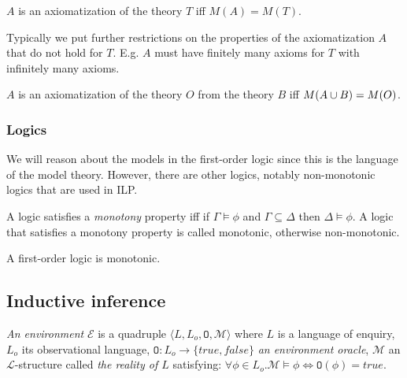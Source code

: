 \begin{defn}
$A$ is an axiomatization of the theory $T$ iff $M(A)=M(T)$.
\end{defn}

\begin{remark}
Typically we put further restrictions on the properties of the axiomatization $A$ that do not hold for $T$. E.g. $A$ must have finitely many axioms for $T$ with infinitely many axioms.
\end{remark}

\begin{defn}
$A$ is an axiomatization of the theory $O$ from the theory $B$ iff $M(A \cup B)=M(O)$.
\end{defn}

\subsubsection{Logics\cite{stanford2010}}
\begin{defn}
We will reason about the models in the first-order logic since this is the language of the model theory. However, there are other logics, notably non-monotonic logics that are used in ILP.

A logic satisfies a \emph{monotony} property iff
if $\Gamma \models \phi$ and $\Gamma \subseteq \Delta$ then $\Delta \models \phi$. A logic that satisfies a monotony property is called monotonic, otherwise non-monotonic.
\end{defn}

\begin{exmp}
A first-order logic is monotonic.
\end{exmp}

\subsection{Inductive inference}
\begin{defn}
\emph{An environment} $\mathcal{E}$ is a quadruple $\langle L, L_o, \mathtt{O}, \mathcal{M} \rangle$ where $L$ is a language of enquiry, $L_o$ its observational language, $\mathtt{O}:L_o \to \{true, false\}$ \emph{an environment oracle}, $\mathcal{M}$ an $\mathcal{L}$-structure called \emph{the reality of $L$} satisfying:
$\forall \phi \in L_o. \mathcal{M} \models \phi \iff \mathtt{O}(\phi)=true$.
\end{defn}

